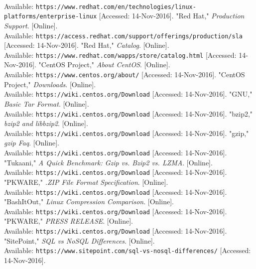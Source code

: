 \documentclass[letterpaper, 10pt,titlepage]{article}
\begin{document}
\begin{thebibliography}{22}
\\Available: \texttt{https://www.redhat.com/en/technologies/linux-platforms/enterprise-linux} [Accessed: 14-Nov-2016].
"Red Hat," \textit{Production Support}. [Online]. 
\\Available: \texttt{https://access.redhat.com/support/offerings/production/sla} [Accessed: 14-Nov-2016].
"Red Hat," \textit{Catalog}. [Online]. 
\\Available: \texttt{https://www.redhat.com/wapps/store/catalog.html} [Accessed: 14-Nov-2016].
"CentOS Project," \textit{About CentOS}. [Online]. 
\\Available: \texttt{https://www.centos.org/about/} [Accessed: 14-Nov-2016].
"CentOS Project," \textit{Downloads}. [Online]. 
\\Available: \texttt{https://wiki.centos.org/Download} [Accessed: 14-Nov-2016].
"GNU," \textit{Basic Tar Format}. [Online]. 
\\Available: \texttt{https://wiki.centos.org/Download} [Accessed: 14-Nov-2016].
"bzip2," \textit{bzip2 and libbzip2}. [Online]. 
\\Available: \texttt{https://wiki.centos.org/Download} [Accessed: 14-Nov-2016].
"gzip," \textit{gzip Faq}. [Online]. 
\\Available: \texttt{https://wiki.centos.org/Download} [Accessed: 14-Nov-2016].
"Tukaani," \textit{A Quick Benchmark: Gzip vs. Bzip2 vs. LZMA}. [Online]. 
\\Available: \texttt{https://wiki.centos.org/Download} [Accessed: 14-Nov-2016].
"PKWARE," \textit{.ZIP File Format Specification}. [Online]. 
\\Available: \texttt{https://wiki.centos.org/Download} [Accessed: 14-Nov-2016].
"BashItOut," \textit{Linux Compression Comparison}. [Online]. 
\\Available: \texttt{https://wiki.centos.org/Download} [Accessed: 14-Nov-2016].
"PKWARE," \textit{PRESS RELEASE}. [Online]. 
\\Available: \texttt{https://wiki.centos.org/Download} [Accessed: 14-Nov-2016].
"SitePoint," \textit{SQL vs NoSQL Differences}. [Online]. 
\\Available: \texttt{https://www.sitepoint.com/sql-vs-nosql-differences/} [Accessed: 14-Nov-2016].







\end{thebibliography}
\end{document}
